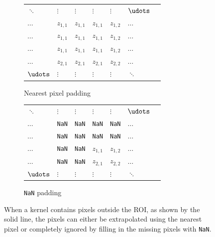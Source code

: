 \begin{figure}
  \centering
  \begin{subfigure}[b]{\subSize}
      \begin{tabular}{lllllll}
         $\ddots$ & $\vdots$ & $\vdots$ & $\vdots$ & $\vdots$ & $\udots$ \\
         $\dotsc$ & $z_{1,1}$ & $z_{1,1}$ & $z_{1,1}$ & $z_{1,2}$ & $\dotsc$ \\
         $\dotsc$ & $z_{1,1}$ & $z_{1,1}$ & $z_{1,1}$ & $z_{1,2}$ & $\dotsc$ \\ \cline{4-6}
         $\dotsc$ & $z_{1,1}$ & \multicolumn{1}{l|}{$z_{1,1}$} & $z_{1,1}$ & $z_{1,2}$ & $\dotsc$ \\
         $\dotsc$ & $z_{2,1}$ & \multicolumn{1}{l|}{$z_{2,1}$}  & $z_{2,1}$ & $z_{2,2}$ & $\dotsc$ \\
         $\udots$ & $\vdots$ & \multicolumn{1}{l|}{$\vdots$}  & $\vdots$ & $\vdots$ & $\ddots$
    \end{tabular}
    \caption{Nearest pixel padding}
    \label{fig:inference_padding_nearest}
  \end{subfigure}
  \begin{subfigure}[b]{\subSize}
      \begin{tabular}{lllllll}
         $\ddots$ & $\vdots$ & $\vdots$ & $\vdots$ & $\vdots$ & $\udots$ \\
         $\dotsc$ & \texttt{NaN} & \texttt{NaN} & \texttt{NaN} & \texttt{NaN} & $\dotsc$ \\
         $\dotsc$ & \texttt{NaN} & \texttt{NaN} & \texttt{NaN} & \texttt{NaN} & $\dotsc$ \\ \cline{4-6}
         $\dotsc$ & \texttt{NaN} & \multicolumn{1}{l|}{\texttt{NaN}} & $z_{1,1}$ & $z_{1,2}$ & $\dotsc$ \\
         $\dotsc$ & \texttt{NaN} & \multicolumn{1}{l|}{\texttt{NaN}}  & $z_{2,1}$ & $z_{2,2}$ & $\dotsc$ \\
         $\udots$ & $\vdots$ & \multicolumn{1}{l|}{$\vdots$}  & $\vdots$ & $\vdots$ & $\ddots$
    \end{tabular}
    \caption{\texttt{NaN} padding}
    \label{fig:inference_padding_nan}
  \end{subfigure}
  \caption{When a kernel contains pixels outside the ROI, as shown by the solid line, the pixels can either be extrapolated using the nearest pixel or completely ignored by filling in the missing pixels with \texttt{NaN}.}
  \label{fig:inference_padding}
\end{figure}

